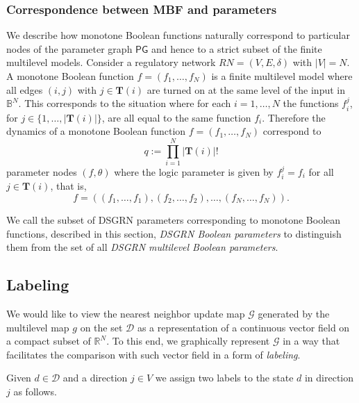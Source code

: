 \documentclass[12pt, notitlepage]{amsart}
\newcommand{\R}{{\mathbb{R}}}
\newcommand{\cD}{\mathcal{D}}
\newcommand{\cG}{{\mathcal G}}
\theoremstyle{definition}
\newcommand{\Targets}{\mathbf{T}}
\newcommand{\PG}{\mathsf{PG}}
\newcommand{\bbB}{\mathbb{B}}
\begin{document}
  \subsubsection{Correspondence between MBF and parameters}
  \label{sec:MBF_parameters}

  We describe how monotone Boolean functions naturally correspond to  particular nodes of the parameter graph $\PG$ and hence to a strict subset of the finite multilevel models. Consider a regulatory network $RN = (V, E, \delta)$ with $|V| = N$. A monotone Boolean function $f = (f_1, \ldots, f_N)$ is a finite multilevel model where all edges $(i, j)$ with $j \in \Targets(i)$ are turned on at the same level of the input in $\bbB^N$. This corresponds to the situation where for each $i = 1, \ldots, N$ the functions $f_i^j$, for $j \in \{ 1, \ldots, |\Targets(i)| \}$, are all equal to the same function $f_i$. Therefore the dynamics of a monotone Boolean function $f = (f_1, \ldots, f_N)$ correspond to
  \[
    q:= \prod_{i=1}^N |\Targets(i)|!
  \]
  parameter nodes $(f, \theta)$ where the logic parameter is given by $f_i^j = f_i$ for all $j \in \Targets(i)$, that is,
  \begin{equation}
    \label{eq:Boolean_par}
    f = \left( (f_1, \ldots, f_1), (f_2, \ldots, f_2), \ldots, (f_N, \ldots, f_N) \right).
  \end{equation}

  We call the subset of DSGRN parameters corresponding to monotone Boolean functions, described in this section, \textit{DSGRN Boolean parameters} to distinguish them from the set of all \textit{DSGRN multilevel Boolean parameters}.

  \subsection{Labeling}

  We would like to view the nearest neighbor update map $\cG$ generated by the multilevel map $g$ on the set $\cD$ as a representation of a continuous vector field on a compact subset of $\R^N$. To this end, we graphically represent $\cG$ in a way that facilitates the comparison with such vector field in a form of \textit{labeling}.

  Given $d \in \cD$ and a direction $j \in V$ we assign two labels to the state $d$ in direction $j$ as follows.
\end{document}
